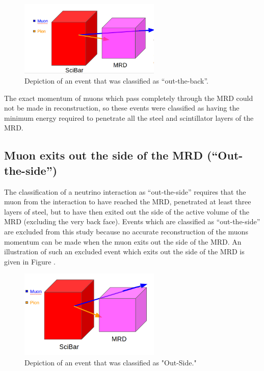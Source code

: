\documentclass[11pt]{article}
\begin{document}
\begin{figure}[H]
\centering
\includegraphics[width=0.6\textwidth]{EventClassifications/NotStopped.png}
\caption{Depiction of an event that was classified as ``out-the-back''.}
\end{figure}\label{fig:NotStoppedEvent}

The exact momentum of muons which pass completely through the MRD could not be made in reconstruction, so these events were classified as having the minimum energy required to penetrate all the steel and scintillator layers of the MRD.

\subsection{Muon exits out the side of the MRD (``Out-the-side'')}
The classification of a neutrino interaction as ``out-the-side'' requires that the muon from the interaction to have reached the MRD, penetrated at least three layers of steel, but to have then exited out the side of the active volume of the MRD (excluding the very back face). Events which are classified as ``out-the-side'' are excluded from this study because no accurate reconstruction of the muons momentum can be made when the muon exits out the side of the MRD. An illustration of such an excluded event which exits out the side of the MRD is given in Figure \label{fig:OutTheSideEvent}.


\begin{figure}[H]
\centering
\includegraphics[width=0.6\textwidth]{EventClassifications/OutSide.png}
\caption{Depiction of an event that was classified as "Out-Side."}
\end{figure}\label{fig:OutTheSideEvent}
\end{document}
